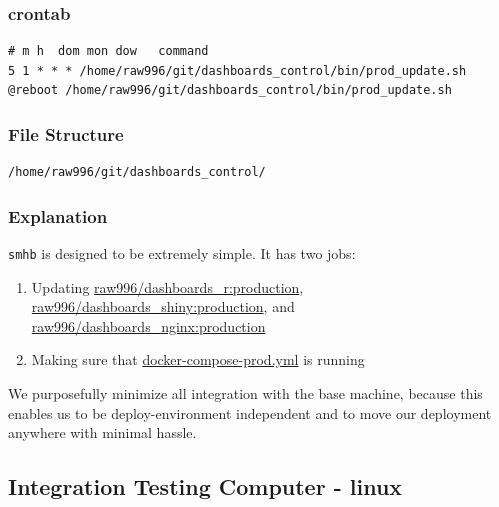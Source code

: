 \documentclass[12pt,]{article}
\providecommand{\tightlist}{%
  \setlength{\itemsep}{0pt}\setlength{\parskip}{0pt}}
\begin{document}
\subsubsection{crontab}\label{crontab}

\begin{verbatim}
# m h  dom mon dow   command
5 1 * * * /home/raw996/git/dashboards_control/bin/prod_update.sh
@reboot /home/raw996/git/dashboards_control/bin/prod_update.sh
\end{verbatim}

\subsubsection{File Structure}\label{file-structure-1}

\begin{verbatim}
/home/raw996/git/dashboards_control/
\end{verbatim}

\subsubsection{Explanation}\label{explanation}

\texttt{smhb} is designed to be extremely simple. It has two jobs:

\begin{enumerate}
\def\labelenumi{\arabic{enumi}.}
\tightlist
\item
  Updating
  \href{https://hub.docker.com/r/raw996/dashboards_r/}{raw996/dashboards\_r:production},
  \href{https://hub.docker.com/r/raw996/dashboards_shiny/}{raw996/dashboards\_shiny:production},
  and
  \href{https://hub.docker.com/r/raw996/dashboards_nginx/}{raw996/dashboards\_nginx:production}
\item
  Making sure that
  \href{https://github.com/raubreywhite/dashboards_control/blob/master/infrastructure/docker-compose-prod.yml}{docker-compose-prod.yml}
  is running
\end{enumerate}

We purposefully minimize all integration with the base machine, because
this enables us to be deploy-environment independent and to move our
deployment anywhere with minimal hassle.

\subsection{Integration Testing Computer -
linux}\label{integration-testing-computer---linux}
\end{document}
